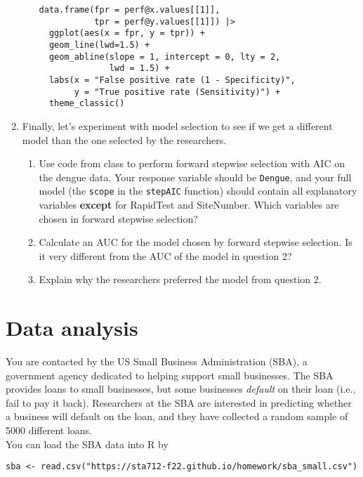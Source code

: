 \documentclass[11pt]{article}
\begin{document}
\begin{enumerate}
\begin{enumerate}
\begin{verbatim}
data.frame(fpr = perf@x.values[[1]],
           tpr = perf@y.values[[1]]) |>
  ggplot(aes(x = fpr, y = tpr)) +
  geom_line(lwd=1.5) +
  geom_abline(slope = 1, intercept = 0, lty = 2,
              lwd = 1.5) +
  labs(x = "False positive rate (1 - Specificity)",
       y = "True positive rate (Sensitivity)") +
  theme_classic()
\end{verbatim}

\end{enumerate}

\item Finally, let's experiment with model selection to see if we get a different model than the one selected by the researchers.

\begin{enumerate}
\item Use code from class to perform forward stepwise selection with AIC on the dengue data. Your response variable should be \verb;Dengue;, and your full model (the \verb;scope; in the \verb;stepAIC; function) should contain all explanatory variables \textbf{except} for RapidTest and SiteNumber. Which variables are chosen in forward stepwise selection?

\item Calculate an AUC for the model chosen by forward stepwise selection. Is it very different from the AUC of the model in question 2?

\item Explain why the researchers preferred the model from question 2.
\end{enumerate}
\end{enumerate}

\section{Data analysis}

You are contacted by the US Small Business Administration (SBA), a government agency dedicated to helping support small businesses. The SBA provides loans to small businesses, but some businesses \textit{default} on their loan (i.e., fail to pay it back). Researchers at the SBA are interested in predicting whether a business will default on the loan, and they have collected a random sample of 5000 different loans.\\

\noindent You can load the SBA data into R by

\begin{verbatim}
sba <- read.csv("https://sta712-f22.github.io/homework/sba_small.csv")
\end{verbatim}
\end{document}
